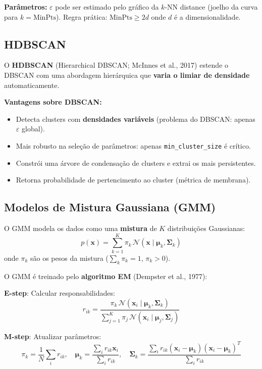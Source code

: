 \documentclass[12pt,a4paper]{article}
\begin{document}
\textbf{Parâmetros:} $\varepsilon$ pode ser estimado pelo gráfico da $k$-NN distance (joelho da curva para $k = \text{MinPts}$). Regra prática: $\text{MinPts} \geq 2d$ onde $d$ é a dimensionalidade.

\subsection{HDBSCAN}

O \textbf{HDBSCAN} (Hierarchical DBSCAN; McInnes et al., 2017) estende o DBSCAN com uma abordagem hierárquica que \textbf{varia o limiar de densidade} automaticamente.

\textbf{Vantagens sobre DBSCAN:}
\begin{itemize}
  \item Detecta clusters com \textbf{densidades variáveis} (problema do DBSCAN: apenas $\varepsilon$ global).
  \item Mais robusto na seleção de parâmetros: apenas \texttt{min\_cluster\_size} é crítico.
  \item Constrói uma árvore de condensação de clusters e extrai os mais persistentes.
  \item Retorna probabilidade de pertencimento ao cluster (métrica de membrana).
\end{itemize}

\subsection{Modelos de Mistura Gaussiana (GMM)}

O GMM modela os dados como uma \textbf{mistura} de $K$ distribuições Gaussianas:
\[
  p(\mathbf{x}) = \sum_{k=1}^{K} \pi_k \, \mathcal{N}(\mathbf{x} \mid \boldsymbol{\mu}_k, \boldsymbol{\Sigma}_k)
\]
onde $\pi_k$ são os pesos da mistura ($\sum_k \pi_k = 1$, $\pi_k > 0$).

O GMM é treinado pelo \textbf{algoritmo EM} (Dempster et al., 1977):

\textbf{E-step}: Calcular responsabilidades:
\[
  r_{ik} = \frac{\pi_k \, \mathcal{N}(\mathbf{x}_i \mid \boldsymbol{\mu}_k, \boldsymbol{\Sigma}_k)}{\sum_{j=1}^{K} \pi_j \, \mathcal{N}(\mathbf{x}_i \mid \boldsymbol{\mu}_j, \boldsymbol{\Sigma}_j)}
\]

\textbf{M-step}: Atualizar parâmetros:
\[
  \pi_k = \frac{1}{N}\sum_i r_{ik}, \quad
  \boldsymbol{\mu}_k = \frac{\sum_i r_{ik} \mathbf{x}_i}{\sum_i r_{ik}}, \quad
  \boldsymbol{\Sigma}_k = \frac{\sum_i r_{ik}(\mathbf{x}_i - \boldsymbol{\mu}_k)(\mathbf{x}_i - \boldsymbol{\mu}_k)^T}{\sum_i r_{ik}}
\]
\end{document}
